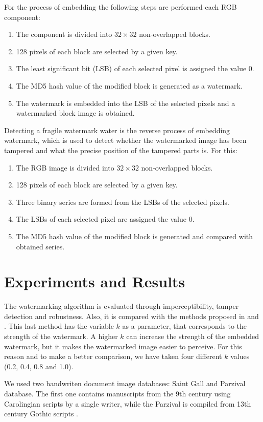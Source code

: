 \documentclass[runningheads]{llncs}
\begin{document}
For the process of embedding the following steps are performed each RGB component:
\begin{enumerate}
	\item The component is divided into $32\times 32$ non-overlapped blocks.
	\item 128 pixels of each block are selected by a given key.
	\item The least significant bit (LSB) of each selected pixel is assigned the value 0.
	\item The MD5 hash value of the modified block is generated as a watermark.
	\item The watermark is embedded into the LSB of the selected pixels and a watermarked block image is obtained.  
\end{enumerate}    

Detecting a fragile watermark water is the reverse process of embedding watermark, which is used to detect whether the watermarked image has been tampered and what the precise position of the tampered parts is. For this:
\begin{enumerate}
	\item The RGB image is divided into $32\times 32$ non-overlapped blocks.
	\item 128 pixels of each block are selected by a given key.
	\item Three binary series are formed from the LSBs of the selected pixels.
	\item The LSBs of each selected pixel are assigned the value 0.
	\item The MD5 hash value of the modified block is generated and compared with obtained series.
\end{enumerate}

\section{Experiments and Results}
The watermarking algorithm is evaluated through imperceptibility, tamper detection and robustness. Also, it is compared with the methods proposed in \cite{shivani2017dual} and \cite{liu2018blind}. This last method has the variable $k$ as a parameter, that corresponds to the strength of the watermark. A higher $k$ can increase the strength of the embedded watermark, but it makes the watermarked image easier to perceive. For this reason and to make a better comparison, we have taken four different $k$ values (0.2, 0.4, 0.8 and 1.0).   

We used two handwriten document image databases: Saint Gall \cite{fischer2011transcription} and Parzival \cite{fischer2009automatic} database. The first one contains manuscripts from the 9th century using Carolingian scripts by a single writer, while the Parzival is compiled from 13th century Gothic scripts \cite{pastor2016complete}.
 
\end{document}
